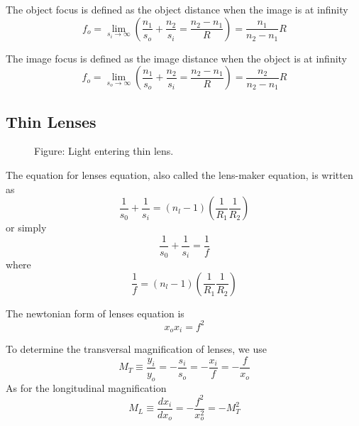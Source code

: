 \documentclass[../../../main.tex]{subfiles}
\begin{document}
The object focus is defined as the object distance when the image is at infinity
\begin{equation*}
    f_o=\lim_{s_i\rightarrow\infty}\left(\frac{n_1}{s_o}+\frac{n_2}{s_i}=\frac{n_2-n_1}{R}\right)=\frac{n_1}{n_2-n_1}R
\end{equation*}

The image focus is defined as the image distance when the object is at infinity
\begin{equation*}
    f_o=\lim_{s_o\rightarrow\infty}\left(\frac{n_1}{s_o}+\frac{n_2}{s_i}=\frac{n_2-n_1}{R}\right)=\frac{n_2}{n_2-n_1}R
\end{equation*}

\subsection*{Thin Lenses}
\begin{figure}
    \centering
    \caption*{Figure: Light entering thin lens.}
\end{figure}
The equation for lenses equation, also called the lens-maker equation, is written as 
\begin{equation*}
    \frac{1}{s_0}+\frac{1}{s_i}=(n_l-1)\left(\frac{1}{R_1}\frac{1}{R_2}\right)
\end{equation*}
or simply
\begin{equation*}
    \frac{1}{s_0}+\frac{1}{s_i}=\frac{1}{f}
\end{equation*}
where
\begin{equation*}
    \frac{1}{f}=(n_l-1)\left(\frac{1}{R_1}\frac{1}{R_2}\right)
\end{equation*}

The newtonian form of lenses equation is 
\begin{equation*}
    x_ox_i=f^2
\end{equation*}

To determine the transversal magnification of lenses, we use 
\begin{equation*}
    M_T\equiv \frac{y_i}{y_o}=-\frac{s_i}{s_o}=-\frac{x_i}{f}=-\frac{f}{x_o}
\end{equation*}
As for the longitudinal magnification
\begin{equation*}
    M_L\equiv \frac{dx_i}{dx_o}=-\frac{f^2}{x_o^2}=-M_T^2
\end{equation*}
\end{document}
